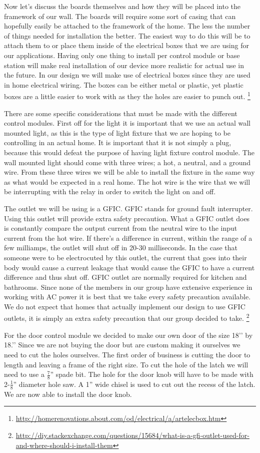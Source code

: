 Now let{}'s discuss the boards themselves and how they will be placed into the
framework of our wall. The boards will require some sort of casing that can
hopefully easily be attached to the framework of the home. The less the number
of things needed for installation the better. The easiest way to do this will
be to attach them to or place them inside of the electrical boxes that we are
using for our applications. Having only one thing to install per control module
or base station will make real installation of our device more realistic for
actual use in the future. In our design we will make use of electrical boxes
since they are used in home electrical wiring. The boxes can be either metal or
plastic, yet plastic boxes are a little easier to work with as they the holes
are easier to punch out.
\footnote{\url{http://homerenovations.about.com/od/electrical/a/artelecbox.htm}}

There are some specific considerations that must be made with the different
control modules. First off for the light it is important that we use an actual
wall mounted light, as this is the type of light fixture that we are hoping to
be controlling in an actual home. It is important that it is not simply a plug,
because this would defeat the purpose of having light fixture control module.
The wall mounted light should come with three wires; a hot, a neutral, and a
ground wire. From these three wires we will be able to install the fixture in
the same way as what would be expected in a real home. The hot wire is the wire
that we will be interrupting with the relay in order to switch the light on and
off.

The outlet we will be using is a GFIC. GFIC stands for ground fault
interrupter. Using this outlet will provide extra safety precaution. What a
GFIC outlet does is constantly compare the output current from the neutral wire
to the input current from the hot wire. If there{}'s a difference in current,
within the range of a few milliamps, the outlet will shut off in 20-30
milliseconds. In the case that someone were to be electrocuted by this outlet,
the current that goes into their body would cause a current leakage that would
cause the GFIC to have a current difference and thus shut off.  GFIC outlet are
normally required for kitchen and bathrooms. Since none of the members in our
group have extensive experience in working with AC power it is best that we
take every safety precaution available. We do not expect that homes that
actually implement our design to use GFIC outlets, it is simply an extra safety
precaution that our group decided to take. \footnote{\url{http://diy.stackexchange.com/questions/15684/what-is-a-gfi-outlet-used-for-and-where-should-i-install-them}}


For the door control module we decided to make our own door of the size 18'{}'
by 18.'{}' Since we are not buying the door but are custom making it ourselves
we need to cut the holes ourselves. The first order of business is cutting the
door to length and leaving a frame of the right size. To cut the hole of the
latch we will need to use a $\frac78$'' spade bit. The hole for the door knob
will have to be made with 2-$\frac18$'' diameter hole saw. A 1'' wide chisel is
used to cut out the recess of the latch. We are now able to install the door
knob.
